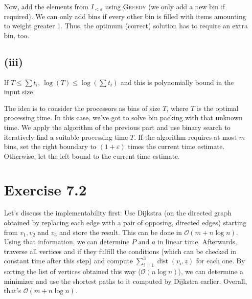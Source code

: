 \documentclass[oneside,a4paper]{amsart}
\begin{document}
Now, add the elements from $I_{< \varepsilon}$ using \textsc{Greedy} (we only add a new bin if required). We can only add bins if every other bin is filled with items amounting to weight greater 1. Thus, the optimum (correct) solution has to require an extra bin, too.
\subsection*{(iii)}
If $T \leq \sum t_i$, $\log(T) \leq \log( \sum t_i)$ and this is polynomially bound in the input size.

The idea is to consider the processors as bins of size $T$, where $T$ is the optimal processing time. In this case, we've got to solve bin packing with that unknown time.
We apply the algorithm of the previous part and use binary search to iteratively find a suitable processing time $T$. If the algorithm requires at most $m$ bins, set the right boundary to $(1 + \varepsilon)$ times the current time estimate. Otherwise, let the left bound to the current time estimate.
\section*{Exercise 7.2}
Let's discuss the implementability first: Use Dijkstra (on the directed graph obtained by replacing each edge with a pair of opposing, directed edges) starting from $v_1, v_2$ and $v_3$ and store the result. This can be done in $\mathcal{O}(m + n \log n)$. Using that information, we can determine $P$ and $a$ in linear time. Afterwards, traverse all vertices and if they fulfill the conditions (which can be checked in constant time after this step) and compute $\sum_{i=1}^3 \operatorname{dist}(v_i, z)$ for each one. By sorting the list of vertices obtained this way ($\mathcal{O}(n \log n)$), we can determine a minimizer and use the shortest paths to it computed by Dijkstra earlier. Overall, that's $\mathcal{O}(m + n \log n)$.
\end{document}
